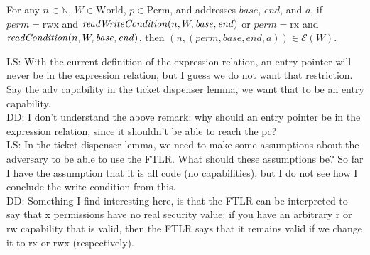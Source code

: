 \documentclass{article}
\newcommand{\forcenewline}{$\phantom{v}$\\}
\newcommand\lau[1]{{\color{purple} \sf \footnotesize {LS: #1}}\\}
\newcommand\dominique[1]{{\color{purple} \sf \footnotesize {DD: #1}}\\}
\newcommand{\var}[1]{\mathit{#1}}
\newcommand{\perm}{\var{perm}}
\newcommand{\plainfun}[2]{
  \ifthenelse{\equal{#2}{}}
             {\mathit{#1}}
             {\mathit{#1}(#2)}
}
\newcommand{\readCond}[1]{\plainfun{readCondition}{#1}}
\newcommand{\writeCond}[1]{\plainfun{readWriteCondition}{#1}}
\newcommand{\asmType}{\plaindom{AsmType}}
\newcommand{\plaindom}[1]{\mathrm{#1}}
\newcommand{\nats}{\mathbb{N}}
\newcommand{\Perms}{\plaindom{Perm}}
\newcommand{\Worlds}{\plaindom{World}}
\newcommand{\intr}[2]{\mathcal{#1}}
\newcommand{\exprintr}[1]{\intr{E}{#1}}
\newcommand{\stder}{\exprintr{\asmType}}
\newcommand{\npair}[2][n]{\left(#1,#2 \right)}
\newcommand{\plainperm}[1]{\mathrm{#1}}
\newcommand{\exec}{\plainperm{rx}}
\newcommand{\rwx}{\plainperm{rwx}}
\begin{document}
\begin{lemma} \forcenewline
  For any $n \in \nats$, $W \in \Worlds$, $p\in \Perms$, and addresses $\var{base}$, $\var{end}$, and $a$, if $\perm = \rwx$ and $\writeCond{n,W,\var{base},\var{end}}$ or $\perm = \exec$ and $\readCond{n,W,\var{base},\var{end}}$, then $\npair{(\perm, \var{base}, \var{end}, a)} \in \stder(W)$.
\end{lemma} %
\lau{With the current definition of the expression relation, an entry pointer will never be in the expression relation, but I guess we do not want that restriction. Say the adv capability in the ticket dispenser lemma, we want that to be an entry capability.}
\dominique{I don't understand the above remark: why should an entry pointer be
  in the expression relation, since it shouldn't be able to reach the pc?}
\lau{In the ticket dispenser lemma, we need to make some assumptions about the adversary to be able to use the FTLR. What should these assumptions be? So far I have the assumption that it is all code (no capabilities), but I do not see how I conclude the write condition from this.}
\dominique{Something I find interesting here, is that the FTLR can be interpreted to say that x permissions have no real security value: if you have an arbitrary r or rw capability that is valid, then the FTLR says that it remains valid if we change it to rx or rwx (respectively).}
\end{document}

